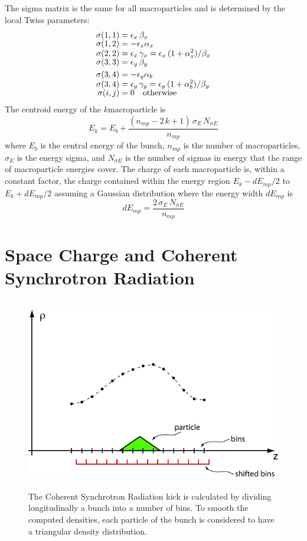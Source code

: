 The sigma matrix is the same for all macroparticles and is
determined by the local Twiss parameters:
\begin{align}
  \sigma(1,1) &= \epsilon_x \, \beta_x \CRNEG
  \sigma(1,2) &= -\epsilon_x \alpha_x  \CRNEG
  \sigma(2,2) &= \epsilon_x \, \gamma_x = 
      \epsilon_x \, (1 + \alpha_x^2) / \beta_x \CRNEG
  \sigma(3,3) &= \epsilon_y \, \beta_y \\
  \sigma(3,4) &= -\epsilon_y \alpha_b \CRNEG
  \sigma(3,4) &= \epsilon_y \, \gamma_y = 
      \epsilon_y \, (1 + \alpha_b^2) / \beta_y \CRNEG
  \sigma(i,j) &= 0 \quad \text{otherwise} \nonumber
\end{align}
The centroid energy of the $k$\Th macroparticle is
\begin{equation}
  E_k = E_b + \frac{(n_{mp} - 2 \, k + 1) \, \sigma_E \, N_{\sigma E}}{n_{mp}}
\end{equation}
where $E_b$ is the central energy of the bunch, $n_{mp}$ is the number of macroparticles, $\sigma_E$
is the energy sigma, and $N_{\sigma E}$ is the number of sigmas in energy that the range of
macroparticle energies cover. The charge of each macroparticle is, within a constant factor, the
charge contained within the energy region $E_k - dE_{mp}/2$ to $E_k + dE_{mp}/2$ assuming a Gaussian
distribution where the energy width $dE_{mp}$ is
\begin{equation}
  dE_{mp} = \frac{2 \, \sigma_E \, N_{\sigma E}}{n_{mp}}
\end{equation}

\section{Space Charge and Coherent Synchrotron Radiation}
\label{s:csr}   

\begin{figure}[!b]
\centering \includegraphics[height=8.4cm]{csr-bin.pdf} \caption[CSR Calculation] {The Coherent
Synchrotron Radiation kick is calculated by dividing longitudinally a bunch into a number of
bins. To smooth the computed densities, each particle of the bunch is considered to have a
triangular density distribution.}  \label{f:csr.bin}
\end{figure}

